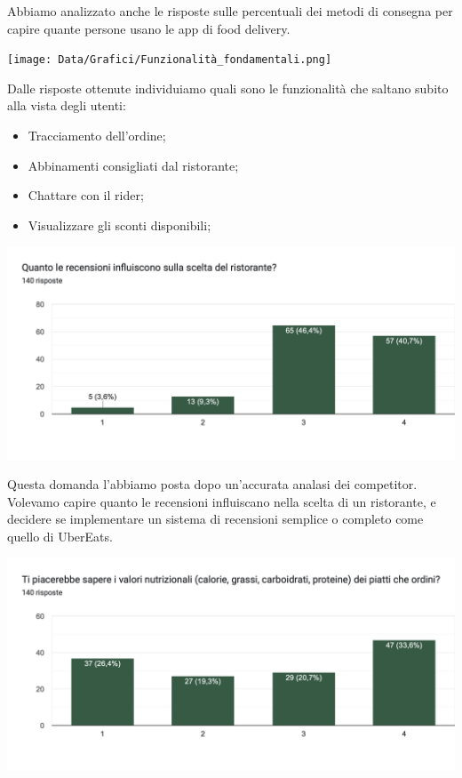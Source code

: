 \documentclass{article}
\begin{document}
\par Abbiamo analizzato anche le risposte sulle percentuali dei metodi di consegna per capire quante persone usano le app di food delivery.\par \vspace{1cm}
\texttt{[image: Data/Grafici/Funzionalità\_fondamentali.png]}\par
Dalle risposte ottenute individuiamo quali sono le funzionalità che saltano subito alla vista degli utenti:
\par \begin{itemize}
    \item Tracciamento dell'ordine;
    \item Abbinamenti consigliati dal ristorante;
    \item Chattare con il rider;
    \item Visualizzare gli sconti disponibili;
\end{itemize}   \vspace{1cm} \par
\includegraphics[width=\textwidth]{Data/Grafici/recensioni_influiscono.png}\par
Questa domanda l'abbiamo posta dopo un'accurata analasi dei competitor. Volevamo capire quanto le recensioni influiscano nella scelta di un ristorante, e decidere se implementare un sistema di recensioni semplice o completo come quello di UberEats.
    \par \vspace{1cm}\includegraphics[width=\textwidth]{Data/Grafici/Valori_nutrizionali.png}\par
\end{document}
